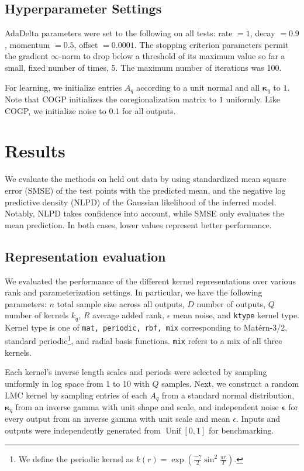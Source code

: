 \documentclass{article}
\def\bse{{\boldsymbol\epsilon}}
\def\bsk{{\boldsymbol\kappa}}
\DeclareMathOperator\Unif{Unif}
\begin{document}
\subsection{Hyperparameter Settings}

AdaDelta parameters were set to the following on all tests: rate $=1$, decay $=0.9$, momentum $=0.5$, offset $=0.0001$. The stopping criterion parameters permit the gradient $\infty$-norm to drop below a threshold of its maximum value so far a small, fixed number of times, 5. The maximum number of iterations was 100.

For learning, we initialize entries $A_q$ according to a unit normal and all $\bsk_q$ to $1$. Note that COGP initializes the coregionalization matrix to $1$ uniformly. Like COGP, we initialize noise to $0.1$ for all outputs.

\section{Results}
\label{sec:results}
We evaluate the methods on held out data by using standardized mean square error (SMSE) of the test points with the predicted mean, and the negative log predictive density (NLPD) of the Gaussian likelihood of the inferred model. Notably, NLPD takes confidence into account, while SMSE only evaluates the mean prediction. In both cases, lower values represent better performance. 

\subsection{Representation evaluation}\label{empirical-rep}

We evaluated the performance of the different kernel representations over various rank and parameterization settings. In particular, we have the following parameters: $n$ total sample size across all outputs, $D$ number of outputs, $Q$ number of kernels $k_q$, $R$ average added rank, $\epsilon$ mean noise, and \texttt{ktype} kernel type. Kernel type is one of \texttt{mat, periodic, rbf, mix} corresponding to Mat\'{e}rn-3/2, standard periodic\footnote{We define the periodic kernel as $k(r) = \exp \left(\frac{-\gamma}{2}\sin^2\frac{\pi r}{T}\right)$.}, and radial basis functions. \texttt{mix} refers to a mix of all three kernels.

Each kernel's inverse length scales and periods were selected by sampling uniformly in log space from 1 to 10 with $Q$ samples. Next, we construct a random LMC kernel by sampling entries of each $A_q$ from a standard normal distribution, $\bsk_q$ from an inverse gamma with unit shape and scale, and independent noise $\bse$ for every output from an inverse gamma with unit scale and mean $\epsilon$. Inputs and outputs were independently generated from $\Unif[0,1]$ for benchmarking.
\end{document}
